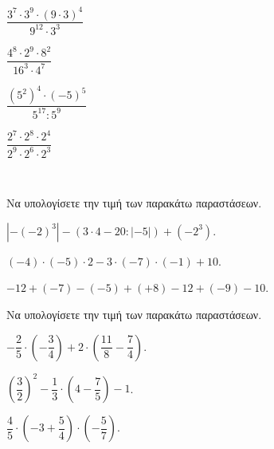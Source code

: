 \documentclass[ektypwsh]{diag-xelatex}
\begin{document}
\begin{thema}
\begin{erwthma}
\begin{multicols}{4}
\begin{rlist}
\item $ \dfrac{3^7\cdot3^9\cdot(9\cdot 3)^4}{9^{12}\cdot 3^3} $
\item $ \dfrac{4^8\cdot 2^9\cdot 8^2}{16^3\cdot 4^7} $
\item $ \dfrac{\left( 5^2\right)^4\cdot(-5)^5}{5^{17}:5^9} $
\item $ \dfrac{2^7\cdot2^8\cdot 2^4}{2^9\cdot2^6\cdot2^3} $
\end{rlist}
\end{multicols}
\end{erwthma}
\item \mbox{}\\\vspace{-7mm}
\begin{erwthma}
\item Να υπολογίσετε την τιμή των παρακάτω παραστάσεων.
\begin{rlist}
\item $ |-(-2)^3|-\left( 3\cdot 4-20:|-5|\right) +(-2^3) $.
\item $ (-4)\cdot(-5)\cdot2-3\cdot(-7)\cdot(-1)+10 $.
\item $ -12+(-7)-(-5)+(+8)-12+(-9)-10 $.
\end{rlist}
\item Να υπολογίσετε την τιμή των παρακάτω παραστάσεων.
\begin{multicols}{2}
\begin{rlist}
\item $ -\dfrac{2}{5}\cdot\left(- \dfrac{3}{4}\right) +2\cdot\left( \dfrac{11}{8}-\dfrac{7}{4}\right) $.
\item $ \left( \dfrac{3}{2}\right)^2-\dfrac{1}{3}\cdot\left( 4-\dfrac{7}{5}\right)-1 $.
\item $ \dfrac{4}{5}\cdot\left( -3 +\dfrac{5}{4}\right)\cdot\left(- \dfrac{5}{7}\right) $.
\end{rlist}
\end{multicols}
\end{erwthma}
\end{thema}
\kaliepityxia
\end{document}
